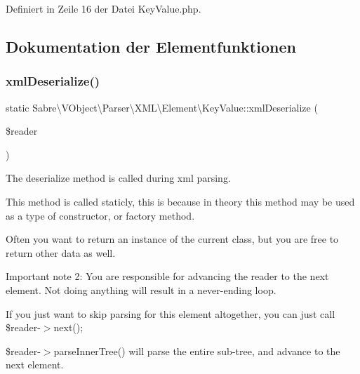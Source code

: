 Definiert in Zeile 16 der Datei Key\+Value.\+php.



\subsection{Dokumentation der Elementfunktionen}
\mbox{\label{class_sabre_1_1_v_object_1_1_parser_1_1_x_m_l_1_1_element_1_1_key_value_a62f4883ab08626374f264db50172dba1}} 
\subsubsection{\texorpdfstring{xml\+Deserialize()}{xmlDeserialize()}}
{\footnotesize\ttfamily static Sabre\textbackslash{}\+V\+Object\textbackslash{}\+Parser\textbackslash{}\+X\+M\+L\textbackslash{}\+Element\textbackslash{}\+Key\+Value\+::xml\+Deserialize (\begin{DoxyParamCaption}\item[{\mbox{\hyperlink{class_sabre_1_1_xml_1_1_reader}{Sabre\+Xml\textbackslash{}\+Reader}}}]{\$reader }\end{DoxyParamCaption})\hspace{0.3cm}{\ttfamily [static]}}

The deserialize method is called during xml parsing.

This method is called staticly, this is because in theory this method may be used as a type of constructor, or factory method.

Often you want to return an instance of the current class, but you are free to return other data as well.

Important note 2\+: You are responsible for advancing the reader to the next element. Not doing anything will result in a never-\/ending loop.

If you just want to skip parsing for this element altogether, you can just call \$reader-\/$>$next();

\$reader-\/$>$parse\+Inner\+Tree() will parse the entire sub-\/tree, and advance to the next element.


